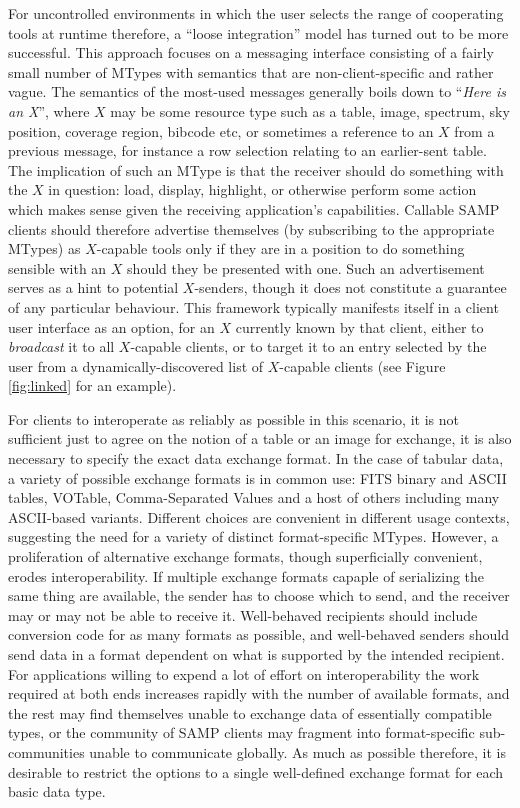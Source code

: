 \documentclass[5p]{elsarticle}
\begin{document}
For uncontrolled environments in which the user selects
the range of cooperating tools at runtime therefore,
a ``loose integration'' model has turned out to be more successful.
This approach focuses on a messaging interface
consisting of a fairly small number of MTypes with
semantics that are non-client-specific and rather vague.
The semantics of the most-used messages generally boils down to
``{\em Here is an X}'', where $X$ may be some resource type such as a
table, image, spectrum,
sky position, coverage region, bibcode etc,
or sometimes a reference to an $X$ from a previous message,
for instance a row selection relating to an earlier-sent table.
The implication of such an MType is that the receiver should do
something with the $X$ in question: load, display, highlight,
or otherwise perform some action which makes sense given the
receiving application's capabilities.
Callable SAMP clients should therefore advertise themselves
(by subscribing to the appropriate MTypes) as $X$-capable
tools only if they are in a position to do something sensible
with an $X$ should they be presented with one.
Such an advertisement serves as a hint to potential $X$-senders,
though it does not constitute a guarantee of any particular behaviour.
This framework typically manifests itself in a client user interface
as an option, for an $X$ currently known by that client,
either to {\em broadcast\/} it to all $X$-capable clients,
or to target it to an entry selected by the user
from a dynamically-discovered list of $X$-capable clients
(see Figure \ref{fig:linked} for an example).

For clients to interoperate as reliably as possible in this scenario,
it is not sufficient just to agree on the notion of a table or an image
for exchange, it is also necessary to specify the exact data exchange
format.
In the case of tabular data, a variety of possible exchange formats
is in common use: FITS binary and ASCII tables, VOTable,
Comma-Separated Values and a host of others including 
many ASCII-based variants.  Different choices are convenient in
different usage contexts, suggesting the need for a variety of
distinct format-specific MTypes.
However, a proliferation of alternative exchange formats,
though superficially convenient, erodes interoperability.
If multiple exchange formats capaple of serializing the same thing
are available,
the sender has to choose which to send, and the receiver may or
may not be able to receive it.
Well-behaved recipients should include conversion code for as many
formats as possible, and well-behaved senders should send data
in a format dependent on what is supported by the intended recipient.
For applications willing to expend a lot of effort on interoperability 
the work required at both ends increases rapidly with the number of
available formats, and the rest may find themselves unable to
exchange data of essentially compatible types,
or the community of SAMP clients may fragment into format-specific
sub-communities unable to communicate globally.
As much as possible therefore, it is desirable to restrict the options
to a single well-defined exchange format for each basic data type.
\end{document}
